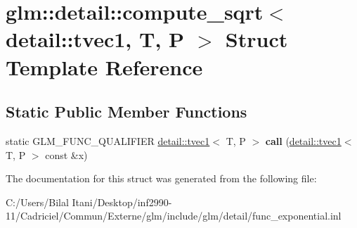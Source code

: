 \hypertarget{structglm_1_1detail_1_1compute__sqrt_3_01detail_1_1tvec1_00_01_t_00_01_p_01_4}{}\section{glm\+:\+:detail\+:\+:compute\+\_\+sqrt$<$ detail\+:\+:tvec1, T, P $>$ Struct Template Reference}
\label{structglm_1_1detail_1_1compute__sqrt_3_01detail_1_1tvec1_00_01_t_00_01_p_01_4}
\subsection*{Static Public Member Functions}
\begin{DoxyCompactItemize}
\item 
static G\+L\+M\+\_\+\+F\+U\+N\+C\+\_\+\+Q\+U\+A\+L\+I\+F\+I\+ER \hyperlink{structglm_1_1detail_1_1tvec1}{detail\+::tvec1}$<$ T, P $>$ {\bfseries call} (\hyperlink{structglm_1_1detail_1_1tvec1}{detail\+::tvec1}$<$ T, P $>$ const \&x)\hypertarget{structglm_1_1detail_1_1compute__sqrt_3_01detail_1_1tvec1_00_01_t_00_01_p_01_4_a19be057111b1a9d9459f75355ac256f5}{}\label{structglm_1_1detail_1_1compute__sqrt_3_01detail_1_1tvec1_00_01_t_00_01_p_01_4_a19be057111b1a9d9459f75355ac256f5}

\end{DoxyCompactItemize}


The documentation for this struct was generated from the following file\+:\begin{DoxyCompactItemize}
\item 
C\+:/\+Users/\+Bilal Itani/\+Desktop/inf2990-\/11/\+Cadriciel/\+Commun/\+Externe/glm/include/glm/detail/func\+\_\+exponential.\+inl\end{DoxyCompactItemize}
